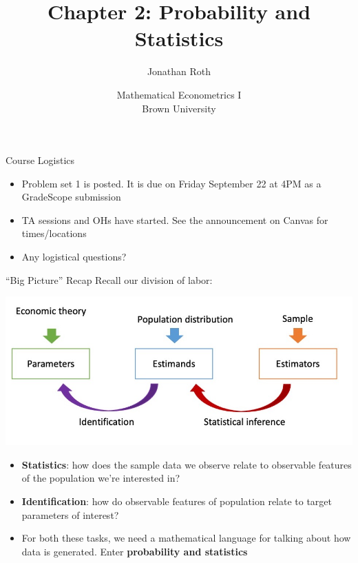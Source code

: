 \documentclass[11pt,english,handout]{beamer}
\begin{document}
\begin{frame}[noframenumbering]{}
\vspace{0.5cm}
\title[]{Chapter 2: Probability and Statistics}
\author{Jonathan Roth}
\date{Mathematical Econometrics I \\ Brown University \\ } 
\titlepage {\small{}\ }\thispagestyle{empty} \vspace{-30pt}

\end{frame}
 
\begin{frame}{Course Logistics}

\begin{itemize}
\item
Problem set 1 is posted. It is due on Friday September 22 at 4PM as a GradeScope submission
\bigskip

\item
TA sessions and OHs have started. See the announcement on Canvas for times/locations
\bigskip

\item
Any logistical questions?
\end{itemize}	
\end{frame}



\begin{frame}{``Big Picture'' Recap}
\vspace{0.1cm}
Recall our division of labor:
\begin{center}
\includegraphics[width=0.9\linewidth]{BigPicture.jpg}
\end{center}
\vspace{-0.2cm}

\begin{itemize}
\item
\textbf{Statistics}: how does the sample data we observe relate to observable features of the population we're interested in? 
\smallskip

\item
\textbf{Identification}: how do observable features of population relate to target parameters of interest? 
\smallskip
\pause{}

\item
For both these tasks, we need a mathematical language for talking about how data is generated. Enter \textbf{probability and statistics}


\end{itemize}

\end{frame}
\end{document}
